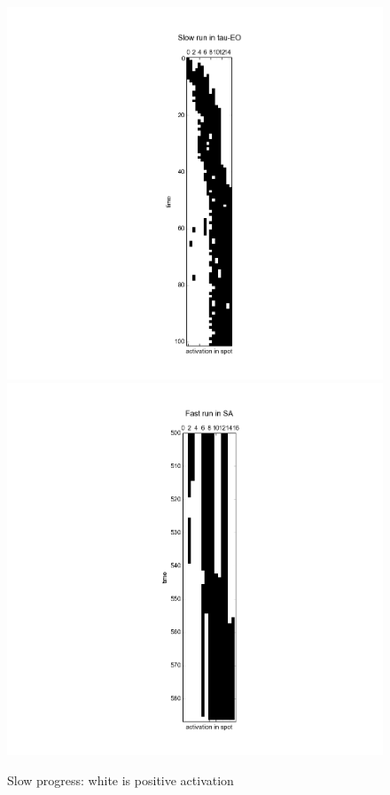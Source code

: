 \documentclass[12pt]{article}
\begin{document}
\begin{figure}
  \label{fig:slow_progess}
  \includegraphics{eo_slow}
  \includegraphics{sa_slow}
  \caption{Slow progress: white is positive activation}
\end{figure}
\end{document}
